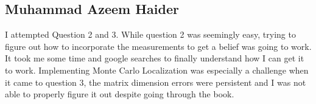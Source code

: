 \documentclass[answers]{exam}
\begin{document}
\begin{questions}
\begin{parts}
\begin{solution}
            \subsection*{Muhammad Azeem Haider}
            I attempted Question 2 and 3. While question 2 was seemingly easy, trying to
            figure out how to incorporate the measurements to get a belief was going to
            work. It took me some time and google searches to finally understand how I can
            get it to work. Implementing Monte Carlo Localization was especially a
            challenge when it came to question 3, the matrix dimension errors were
            persistent and I was not able to properly figure it out despite going through
            the book.

        \end{solution}
    \end{parts}
\end{questions}
\end{document}
